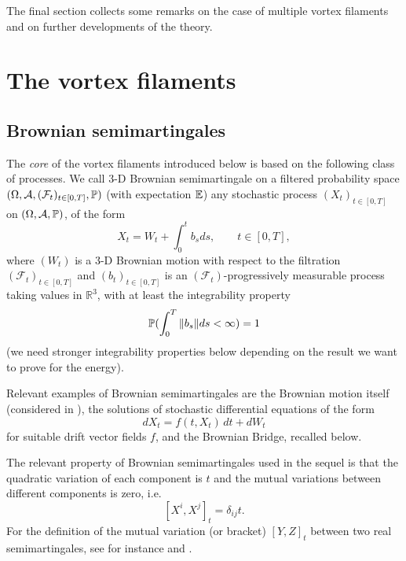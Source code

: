 The final section collects some remarks on the case of multiple vortex
filaments and on further developments of the theory. 
 
\section{The vortex filaments}

\subsection{Brownian semimartingales}

The \textit{core} of the vortex filaments introduced below is based on the
following class of processes. We call $3$-D Brownian semimartingale on a
filtered probability space $( \Omega ,\mathcal{A},( \mathcal{F}%
_{t}) _{t\in [ 0,T] },\prob) $ 
(with expectation $\operatorname{{\mathbb E}}$) any
stochastic process $\left( X_{t}\right) _{t\in \left[ 0,T\right] }$ on $%
\left( \Omega ,\mathcal{A},\prob\right) $, of the form 
\begin{equation}
X_{t}=W_{t}+\int_{0}^{t}b_{s}ds, \qquad t\in \left[ 0,T\right] ,
\label{Browsemim}
\end{equation}
where $( W_{t} ) $ is a $3$-D Brownian motion with respect to the
filtration $( \mathcal{F}_{t} ) _{t\in \left[ 0,T\right] }$ and $%
( b_{t} ) _{t\in \left[ 0,T\right] }$ is an $( \mathcal{F}%
_{t})$-progressively measurable process taking values in
$\mathbb{R}^{3}$, 
with at least the integrability property 
$$
\operatorname{{\mathbb P}} ( \int_{0}^{T}\|
b_{s}\| ds<\infty ) =1
$$
(we need stronger integrability properties below depending on the result we want to prove for
the energy).

Relevant examples of Brownian semimartingales are the Brownian motion itself
(considered in \cite{Fl2}), the solutions of stochastic differential
equations of the form 
\begin{equation*}
dX_{t}=f(t,X_{t})\, dt+dW_{t}
\end{equation*}
for suitable drift vector fields $f$, and the Brownian Bridge, recalled
below.

The relevant property of Brownian semimartingales used in the sequel is that
the quadratic variation of each component is $t$ and the mutual variations
between different components is zero, i.e. 
\begin{equation*}
\left[ X^{i},X^{j}\right] _{t}=\delta_{ij}t.
\end{equation*}
For the definition of the mutual variation (or bracket) $\left[ Y,Z\right]
_{t}$ between two real semimartingales, see for instance \cite{Ku} and \cite
{R-Y}.


